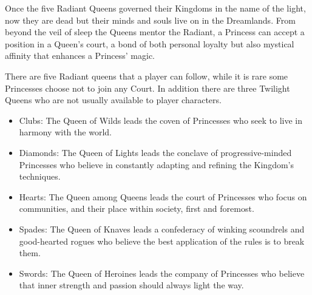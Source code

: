 Once the five Radiant Queens governed their Kingdoms in the name of the light, now they are dead but their minds and souls live on in the Dreamlands. From beyond the veil of sleep the Queens mentor the Radiant, a Princess can accept a position in a Queen's court, a bond of both personal loyalty but also mystical affinity that enhances a Princess' magic. 

There are five Radiant queens that a player can follow, while it is rare some Princesses choose not to join any Court. In addition there are three Twilight Queens who are not usually available to player characters. 

\begin{itemize}
\item Clubs: The Queen of Wilds leads the coven of Princesses who seek to live in harmony with the world.
\item Diamonds: The Queen of Lights leads the conclave of progressive-minded Princesses who believe in constantly adapting and refining the Kingdom's techniques.
\item Hearts: The Queen among Queens leads the court of Princesses who focus on communities, and their place within society, first and foremost.
\item Spades: The Queen of Knaves leads a confederacy of winking scoundrels and good-hearted rogues who believe the best application of the rules is to break them.
\item Swords: The Queen of Heroines leads the company of Princesses who believe that inner strength and passion should always light the way. 
\end{itemize}

